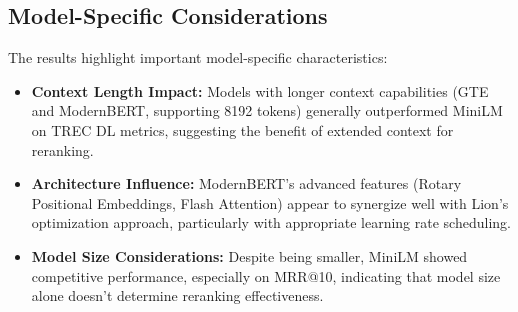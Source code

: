 \subsection{Model-Specific Considerations}

The results highlight important model-specific characteristics:

\begin{itemize}
    \item \textbf{Context Length Impact:} Models with longer context capabilities (GTE and ModernBERT, supporting 8192 tokens) generally outperformed MiniLM on TREC DL metrics, suggesting the benefit of extended context for reranking.
    
    \item \textbf{Architecture Influence:} ModernBERT's advanced features (Rotary Positional Embeddings, Flash Attention) appear to synergize well with Lion's optimization approach, particularly with appropriate learning rate scheduling.
    
    \item \textbf{Model Size Considerations:} Despite being smaller, MiniLM showed competitive performance, especially on MRR@10, indicating that model size alone doesn't determine reranking effectiveness.
\end{itemize}

